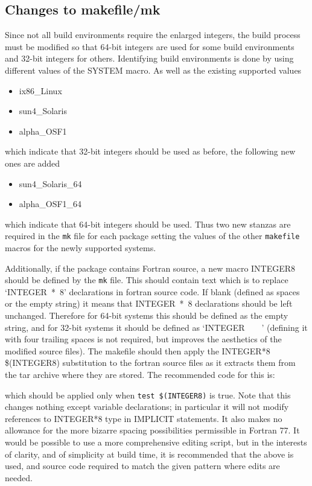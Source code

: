 \documentclass[twoside,11pt,nolof]{starlink}
\providecommand{\file}[1]{\texttt{#1}}
\newenvironment{squote}{\begin{small}}{\end{small}}
\begin{document}
\subsection{Changes to makefile/mk\label{sec:makefile}}

Since not all build environments require the enlarged integers,
the build process must be modified so that 64-bit integers are
used for some build environments and 32-bit integers for others.
Identifying build environments is done by using different values
of the SYSTEM macro.  As well as the existing supported values
\begin{itemize}
\item ix86\_Linux
\item sun4\_Solaris
\item alpha\_OSF1
\end{itemize}
which indicate that 32-bit integers should be used as before,
the following new ones are added
\begin{itemize}
\item sun4\_Solaris\_64
\item alpha\_OSF1\_64
\end{itemize}
which indicate that 64-bit integers should be used.
Thus two new stanzas are required in the \file{mk} file for each package
setting the values of the other \file{makefile} macros for the newly
supported systems.

Additionally, if the package contains Fortran source,
a new macro INTEGER8 should be
defined by the \file{mk} file.  This should contain text which is to
replace `INTEGER~*~8' declarations in fortran source code.
If blank (defined as spaces or the empty string) it means
that INTEGER~*~8 declarations should be left unchanged.
Therefore for 64-bit systems this should be defined as the empty
string, and for 32-bit systems it should be defined as `INTEGER~~~~'
(defining it with four trailing spaces
is not required, but improves the aesthetics of
the modified source files).
The makefile should then apply the
INTEGER*8 \latexhtml{$\rightarrow$}{->} \$(INTEGER8)
substitution to the fortran source files as it extracts them from the
tar archive where they are stored.
The recommended code for this is:
\begin{squote}
\end{squote}
which should be applied only when \texttt{test \$(INTEGER8)} is true.
Note that this changes nothing except variable declarations;
in particular it will not modify references to INTEGER*8 type in IMPLICIT
statements.
It also makes no allowance for the more bizarre spacing possibilities
permissible in Fortran 77.
It would be possible to use a more comprehensive editing script,
but in the interests of clarity, and of simplicity at build time,
it is recommended that the above is used,
and source code required to match the given pattern where edits
are needed.
\end{document}
